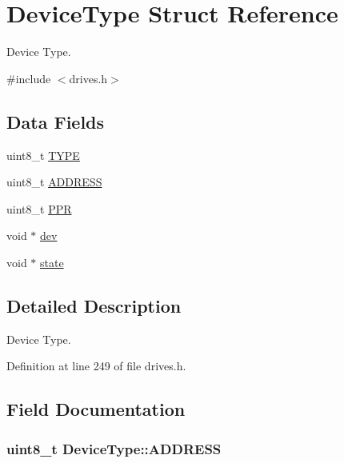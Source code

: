 \hypertarget{structDeviceType}{}\section{Device\+Type Struct Reference}
\label{structDeviceType}


Device Type.  




{\ttfamily \#include $<$drives.\+h$>$}

\subsection*{Data Fields}
\begin{DoxyCompactItemize}
\item 
uint8\+\_\+t \hyperlink{structDeviceType_acee5219162b6f47a9423b2086d127ede}{T\+Y\+PE}
\item 
uint8\+\_\+t \hyperlink{structDeviceType_a62529b7435785e39e8e7c5019303c2dd}{A\+D\+D\+R\+E\+SS}
\item 
uint8\+\_\+t \hyperlink{structDeviceType_ae0e59c6c17582ff80bdab3f2010e8d57}{P\+PR}
\item 
void $\ast$ \hyperlink{structDeviceType_a59fc3b3cb45f8ee0cd1016bd64804d3b}{dev}
\item 
void $\ast$ \hyperlink{structDeviceType_ad0fc43d63606bab6c259047e36512e08}{state}
\end{DoxyCompactItemize}


\subsection{Detailed Description}
Device Type. 

Definition at line 249 of file drives.\+h.



\subsection{Field Documentation}
\subsubsection[{\texorpdfstring{A\+D\+D\+R\+E\+SS}{ADDRESS}}]{\setlength{\rightskip}{0pt plus 5cm}uint8\+\_\+t Device\+Type\+::\+A\+D\+D\+R\+E\+SS}\hypertarget{structDeviceType_a62529b7435785e39e8e7c5019303c2dd}{}\label{structDeviceType_a62529b7435785e39e8e7c5019303c2dd}


